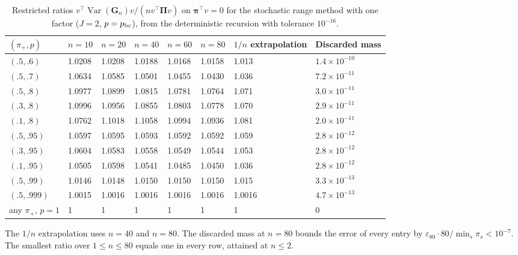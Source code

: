 \documentclass[12pt,a4paper]{article}
\theoremstyle{definition}
\theoremstyle{remark}\newtheorem{remark}{Remark}
\numberwithin{equation}{section}
\newcommand{\Var}{\operatorname{Var}}
\begin{document}
\begin{table}[!htbp]
\centering
\caption{Restricted ratios $v^\top\Var(\bm G_n)v/(nv^\top\bm\Pi v)$ on $\bm\pi^\top v=0$ for the stochastic range method with one factor ($J=2$, $p=p_{\rm bc}$), from the deterministic recursion with tolerance $10^{-16}$.}
\label{tab:supp-exact-sign}
\begin{threeparttable}
\begin{singlespace}
\footnotesize
\setlength{\tabcolsep}{3.5pt}
\begin{tabular}{@{}llllllll@{}}
\toprule
$(\pi_+,p)$ & $n=10$ & $n=20$ & $n=40$ & $n=60$ & $n=80$ & $1/n$ extrapolation & Discarded mass\\
\midrule
$(.5,.6)$ & 1.0208 & 1.0208 & 1.0188 & 1.0168 & 1.0158 & 1.013 & $1.4\times10^{-10}$\\
$(.5,.7)$ & 1.0634 & 1.0585 & 1.0501 & 1.0455 & 1.0430 & 1.036 & $7.2\times10^{-11}$\\
$(.5,.8)$ & 1.0977 & 1.0899 & 1.0815 & 1.0781 & 1.0764 & 1.071 & $3.0\times10^{-11}$\\
$(.3,.8)$ & 1.0996 & 1.0956 & 1.0855 & 1.0803 & 1.0778 & 1.070 & $2.9\times10^{-11}$\\
$(.1,.8)$ & 1.0762 & 1.1018 & 1.1058 & 1.0994 & 1.0936 & 1.081 & $2.0\times10^{-11}$\\
$(.5,.95)$ & 1.0597 & 1.0595 & 1.0593 & 1.0592 & 1.0592 & 1.059 & $2.8\times10^{-12}$\\
$(.3,.95)$ & 1.0604 & 1.0583 & 1.0558 & 1.0549 & 1.0544 & 1.053 & $2.8\times10^{-12}$\\
$(.1,.95)$ & 1.0505 & 1.0598 & 1.0541 & 1.0485 & 1.0450 & 1.036 & $2.8\times10^{-12}$\\
$(.5,.99)$ & 1.0146 & 1.0148 & 1.0150 & 1.0150 & 1.0150 & 1.015 & $3.3\times10^{-13}$\\
$(.5,.999)$ & 1.0015 & 1.0016 & 1.0016 & 1.0016 & 1.0016 & 1.0016 & $4.7\times10^{-13}$\\
any $\pi_+$, $p=1$ & 1 & 1 & 1 & 1 & 1 & 1 & 0\\
\bottomrule
\end{tabular}
\begin{tablenotes}[flushleft]\footnotesize
\item The $1/n$ extrapolation uses $n=40$ and $n=80$. The discarded mass at $n=80$ bounds the error of every entry by $\varepsilon_{80}\cdot80/\min_s\pi_s<10^{-7}$. The smallest ratio over $1\le n\le80$ equals one in every row, attained at $n\le2$.
\end{tablenotes}
\end{singlespace}
\end{threeparttable}
\end{table}
\end{document}
